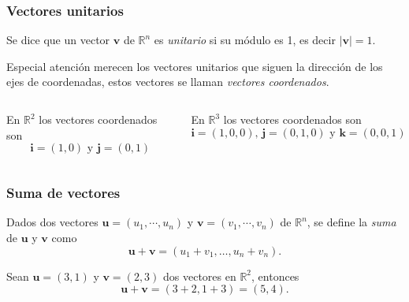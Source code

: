 \begin{frame}
	\frametitle{Vectores unitarios}
	\begin{definicion}
		Se dice que un vector $\mathbf{v}$ de $\mathbb{R}^n$ es \emph{unitario} si su módulo es 1, es decir $|\mathbf{v}|=1$.
	\end{definicion}
	Especial atención merecen los vectores unitarios que siguen la dirección de los ejes de coordenadas, estos vectores se llaman \emph{vectores coordenados}.
	\begin{columns}
		\begin{column}{.48\textwidth}
			En $\mathbb{R}^2$ los vectores coordenados son 
			\[
				\mathbf{i}=(1,0)\mbox{ y }\mathbf{j}=(0,1)
			\]
			\begin{center}
				\scalebox{1}{}
			\end{center}
		\end{column}
		\begin{column}{.48\textwidth}
			En $\mathbb{R}^3$ los vectores coordenados son 
			\[
				\mathbf{i}=(1,0,0)\mbox{, }\mathbf{j}=(0,1,0) \mbox{ y } \mathbf{k}=(0,0,1)
			\]
			\begin{center}
				\scalebox{1}{}
			\end{center}
		\end{column}   
	\end{columns}
\end{frame} 


\begin{frame}
	\frametitle{Suma de vectores}
	\begin{definicion}
		Dados dos vectores $\mathbf{u}=(u_1,\cdots,u_n)$ y $\mathbf{v}=(v_1,\cdots,v_n)$ de $\mathbb{R}^n$, se define la
		\emph{suma} de $\mathbf{u}$ y $\mathbf{v}$ como
		\[
			\mathbf{u}+\mathbf{v} = (u_1+v_1,\ldots, u_n+v_n).
		\]
	\end{definicion}
	
	Sean $\mathbf{u}=(3,1)$ y $\mathbf{v}=(2,3)$ dos vectores en $\mathbb{R}^2$, entonces
	\[
		\mathbf{u}+\mathbf{v} = (3+2,1+3) = (5,4).
	\]
	
	\begin{center}
		\scalebox{0.8}{}
	\end{center}
\end{frame} 



